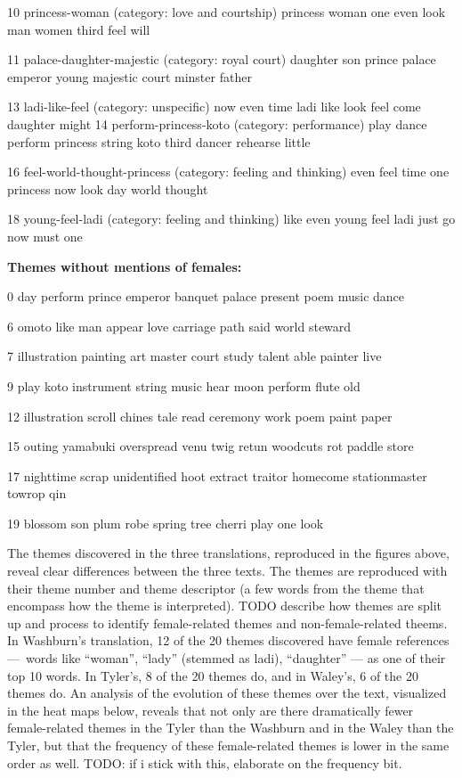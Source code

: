 \documentclass[12pt]{article}
\begin{document}
\begin{flushleft}
\begin{spacing}{2.0}
{\begin{minipage}{0.5\linewidth}
10 princess-woman (category: love and courtship)
princess woman one even look man women third feel will

11 palace-daughter-majestic (category: royal court)
daughter son prince palace emperor young majestic court minster father

13 ladi-like-feel (category: unspecific)
now even time ladi like look feel come daughter might
14 perform-princess-koto (category: performance)
play dance perform princess string koto third dancer rehearse little

16 feel-world-thought-princess (category: feeling and thinking)
even feel time one princess now look day world thought

18 young-feel-ladi (category: feeling and thinking)
like even young feel ladi just go now must one


\textbf{Themes without mentions of females:}

0 day perform prince emperor banquet palace present poem music dance

6 omoto like man appear love carriage path said world steward

7 illustration painting art master court study talent able painter live

9 play koto instrument string music hear moon perform flute old

12 illustration scroll chines tale read ceremony work poem paint paper

15 outing yamabuki overspread venu twig retun woodcuts rot paddle store

17 nighttime scrap unidentified hoot extract traitor homecome stationmaster towrop qin 

19 blossom son plum robe spring tree cherri play one look
\end{minipage}}



The themes discovered in the three translations, reproduced in the figures above, reveal clear differences between the three texts. The themes are reproduced with their theme number and theme descriptor (a few words from the theme that encompass how the theme is interpreted). TODO describe how themes are split up and process to identify female-related themes and non-female-related theems. In Washburn’s translation, 12 of the 20 themes discovered have female references --- words like ``woman'', ``lady'' (stemmed as ladi), ``daughter'' --- as one of their top 10 words. In Tyler’s, 8 of the 20 themes do, and in Waley’s, 6 of the 20 themes do. An analysis of the evolution of these themes over the text, visualized in the heat maps below, reveals that not only are there dramatically fewer female-related themes in the Tyler than the Washburn and in the Waley than the Tyler, but that the frequency of these female-related themes is lower in the same order as well. TODO: if i stick with this, elaborate on the frequency bit.


\end{spacing}
\end{flushleft}
\end{document}
